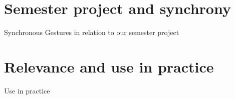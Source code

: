 \documentclass[10pt]{beamer}
\begin{document}
\section{Semester project and synchrony}
\begin{frame}{Synchronous Gestures in relation to our semester project}{}

\end{frame}

\section{Relevance and use in practice}
\begin{frame}{Use in practice}{}

\end{frame}


{\aauwavesbg%
\begin{frame}%
\end{frame}}
\end{document}
